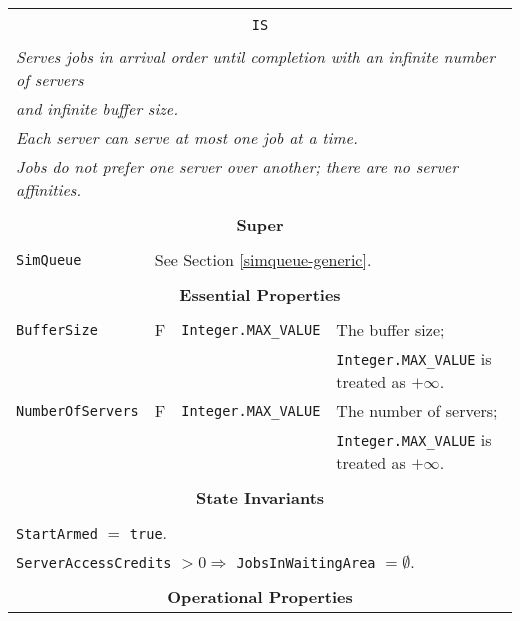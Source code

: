 \documentclass[12pt]{book}
\begin{document}
\begin{tabular}{|l|l|l|l|}
\hline
\multicolumn{4}{|c|}{} \\
\multicolumn{4}{|c|}{\lstinline[basicstyle=\large]{IS}} \\
\multicolumn{4}{|c|}{} \\
\hline
\multicolumn{4}{|l|}{\em Serves jobs in arrival order until completion with an infinite number of servers} \\
\multicolumn{4}{|l|}{\em and infinite buffer size.} \\
\multicolumn{4}{|l|}{\em Each server can serve at most one job at a time.} \\
\multicolumn{4}{|l|}{\em Jobs do not prefer one server over another; there are no server affinities.} \\
\hline
\multicolumn{4}{|c|}{} \\
\multicolumn{4}{|c|}{\bf Super} \\
\multicolumn{4}{|c|}{} \\
\hline
\lstinline|SimQueue| & \multicolumn{3}{|l|}{See Section \ref{simqueue-generic}.} \\
\hline
\multicolumn{4}{|c|}{} \\
\multicolumn{4}{|c|}{\bf Essential Properties} \\
\multicolumn{4}{|c|}{} \\
\hline
\lstinline|BufferSize|      & F & \lstinline|Integer.MAX_VALUE|
                            & The buffer size; \\
                        & & & \lstinline|Integer.MAX_VALUE| is treated as $+\infty$. \\
\hline
\lstinline|NumberOfServers| & F & \lstinline|Integer.MAX_VALUE|
                            & The number of servers; \\
                        & & & \lstinline|Integer.MAX_VALUE| is treated as $+\infty$. \\
\hline
\multicolumn{4}{|c|}{} \\
\multicolumn{4}{|c|}{\bf State  Invariants} \\
\multicolumn{4}{|c|}{} \\
\hline
\multicolumn{4}{|l|}{\lstinline|StartArmed| $=$ \lstinline|true|.} \\
\multicolumn{4}{|l|}{\lstinline|ServerAccessCredits| $> 0 \Rightarrow$ \lstinline|JobsInWaitingArea| $= \emptyset$.} \\
\hline
\multicolumn{4}{|c|}{} \\
\multicolumn{4}{|c|}{\bf Operational Properties} \\

\end{tabular}
\end{document}
